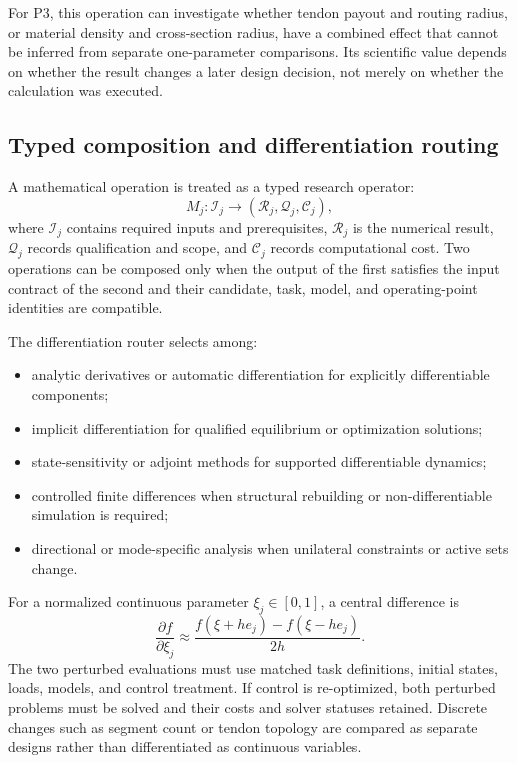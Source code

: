 For P3, this operation can investigate whether tendon payout and routing radius, or material density and cross-section radius, have a combined effect that cannot be inferred from separate one-parameter comparisons. Its scientific value depends on whether the result changes a later design decision, not merely on whether the calculation was executed.

\subsection{Typed composition and differentiation routing}

A mathematical operation is treated as a typed research operator:
\begin{equation}
M_j:\mathcal I_j\longrightarrow
(\mathcal R_j,\mathcal Q_j,\mathcal C_j),
\label{eq:typed-operator}
\end{equation}
where $\mathcal I_j$ contains required inputs and prerequisites, $\mathcal R_j$ is the numerical result, $\mathcal Q_j$ records qualification and scope, and $\mathcal C_j$ records computational cost. Two operations can be composed only when the output of the first satisfies the input contract of the second and their candidate, task, model, and operating-point identities are compatible.

The differentiation router selects among:
\begin{itemize}
  \item analytic derivatives or automatic differentiation for explicitly differentiable components;
  \item implicit differentiation for qualified equilibrium or optimization solutions;
  \item state-sensitivity or adjoint methods for supported differentiable dynamics;
  \item controlled finite differences when structural rebuilding or non-differentiable simulation is required;
  \item directional or mode-specific analysis when unilateral constraints or active sets change.
\end{itemize}
For a normalized continuous parameter $\xi_j\in[0,1]$, a central difference is
\begin{equation}
\frac{\partial f}{\partial\xi_j}
\approx
\frac{f(\xi+h e_j)-f(\xi-h e_j)}{2h}.
\label{eq:finite-difference}
\end{equation}
The two perturbed evaluations must use matched task definitions, initial states, loads, models, and control treatment. If control is re-optimized, both perturbed problems must be solved and their costs and solver statuses retained. Discrete changes such as segment count or tendon topology are compared as separate designs rather than differentiated as continuous variables.

